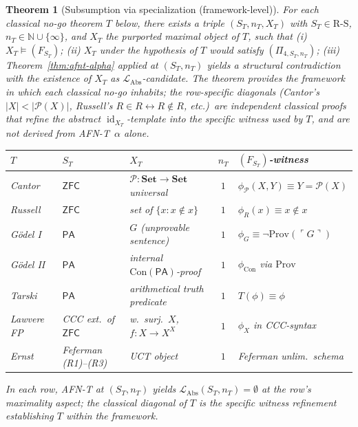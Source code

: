 \documentclass[11pt]{article}
\theoremstyle{plain}
\newtheorem{theorem}{Theorem}[section]
\theoremstyle{definition}
\newcommand{\RS}{\mathrm{R\text{-}S}}
\newcommand{\cP}{\mathcal{P}}
\newcommand{\LAbs}{\mathcal{L}_{\mathrm{Abs}}}
\newcommand{\ZFC}{\mathsf{ZFC}}
\DeclareMathOperator{\id}{id}
\begin{document}
\begin{theorem}[Subsumption via specialization (framework-level)]\label{thm:subsumption}
For each classical no-go theorem $T$ below, there exists a triple $(S_T, n_T, X_T)$ with $S_T \in \RS$, $n_T \in \mathbb{N} \cup \{\infty\}$, and $X_T$ the purported maximal object of $T$, such that (i) $X_T \models (F_{S_T})$; (ii) $X_T$ under the hypothesis of $T$ would satisfy $(\Pi_{4, S_T, n_T})$; (iii) Theorem~\ref{thm:afnt-alpha} applied at $(S_T, n_T)$ yields a structural contradiction with the existence of $X_T$ as $\LAbs$-candidate. The theorem provides the \emph{framework} in which each classical no-go inhabits; the row-specific diagonals (Cantor's $|X|<|\cP(X)|$, Russell's $R \in R \leftrightarrow R \notin R$, etc.)\ are independent classical proofs that refine the abstract $\id_{X_T}$-template into the specific witness used by $T$, and are not derived from AFN-T~$\alpha$ alone.
\begin{center}\footnotesize
\begin{tabular}{@{}lllcl@{}}
\toprule
$T$ & $S_T$ & $X_T$ & $n_T$ & $(F_{S_T})$-witness \\ \midrule
Cantor~\cite{Cantor1891} & $\ZFC$ & $\cP : \mathbf{Set} \to \mathbf{Set}$ universal & $1$ & $\phi_{\cP}(X,Y) \equiv Y = \cP(X)$ \\
Russell~\cite{Russell1903} & $\ZFC$ & set of $\{x : x \notin x\}$ & $1$ & $\phi_R(x) \equiv x \notin x$ \\
G\"odel I~\cite{Godel1931} & $\mathsf{PA}$ & $G$ (unprovable sentence) & $1$ & $\phi_G \equiv \neg \mathrm{Prov}(\ulcorner G \urcorner)$ \\
G\"odel II~\cite{Godel1931} & $\mathsf{PA}$ & internal $\mathrm{Con}(\mathsf{PA})$-proof & $1$ & $\phi_{\mathrm{Con}}$ via $\mathrm{Prov}$ \\
Tarski~\cite{Tarski1936} & $\mathsf{PA}$ & arithmetical truth predicate & $1$ & $T(\phi) \equiv \phi$ \\
Lawvere FP~\cite{Lawvere1969} & CCC ext.\ of $\ZFC$ & w.\ surj.\ $X$, $f:X \to X^X$ & $1$ & $\phi_X$ in CCC-syntax \\
Ernst~\cite{Ernst2015} & Feferman (R1)--(R3) & UCT object & $1$ & Feferman unlim.\ schema \\
\bottomrule
\end{tabular}
\end{center}
In each row, AFN-T at $(S_T, n_T)$ yields $\LAbs(S_T, n_T) = \emptyset$ at the row's maximality aspect; the classical diagonal of $T$ is the specific witness refinement establishing $T$ within the framework.
\end{theorem}
\end{document}
